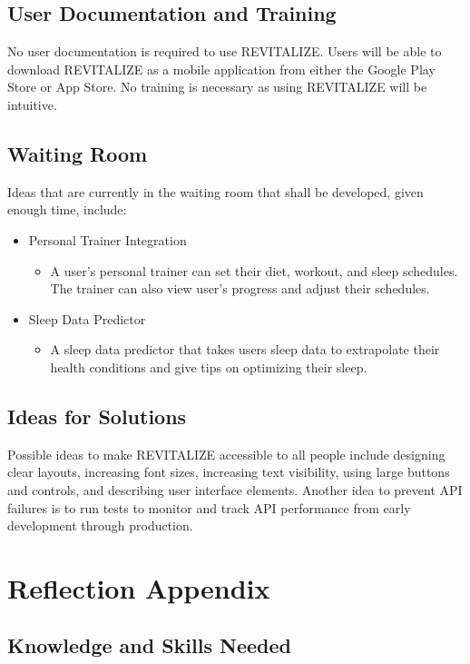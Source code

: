 \documentclass[12pt,letterpaper]{article}
\begin{document}
\subsection{User Documentation and Training}
No user documentation is required to use REVITALIZE. Users will be able to download REVITALIZE as a mobile application from either the Google Play Store or App Store. No training is necessary as using REVITALIZE will be intuitive.

\subsection{Waiting Room}
Ideas that are currently in the waiting room that shall be developed, given enough time, include:
\begin{itemize}
	\item Personal Trainer Integration
	\begin{itemize}
		\item A user's personal trainer can set their diet, workout, and sleep schedules. The trainer can also view user's progress and adjust their schedules.
	\end{itemize}
	\item Sleep Data Predictor
	\begin{itemize}
		\item A sleep data predictor that takes users sleep data to extrapolate their health conditions and give tips on optimizing their sleep.
	\end{itemize}
\end{itemize}

\subsection{Ideas for Solutions}
Possible ideas to make REVITALIZE accessible to all people include designing clear layouts, increasing font sizes, increasing text visibility, using large buttons and controls, and describing user interface elements. Another idea to prevent API failures is to run tests to monitor and track API performance from early development through production.


\section{Reflection Appendix}

\subsection{Knowledge and Skills Needed}
\end{document}
